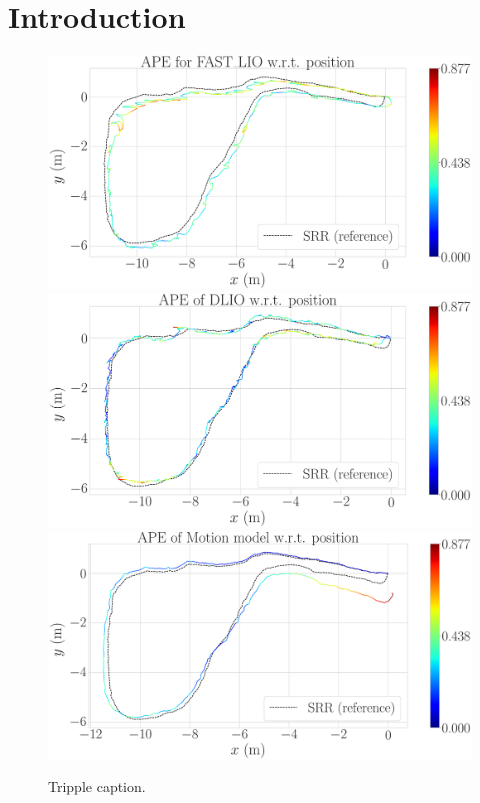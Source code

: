 \section{Introduction}

\begin{figure}
  \centering 
  \includegraphics[width=\linewidth]{img/ape_fast_lio} \vskip 2mm
  \includegraphics[width=\linewidth]{img/ape_dlio} \vskip 2mm
  \includegraphics[width=\linewidth]{img/ape_model}
  \caption{Tripple caption.}
\end{figure}
